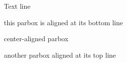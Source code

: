 \documentclass{article}
\begin{document}
Text line
\quad\parbox[b]{1.8cm}{this parbox is aligned at its bottom line} %
\quad\parbox{1.5cm}{center-aligned parbox}                        
\quad\parbox[t]{2cm}{another parbox aligned at its top line} %
\end{document}
